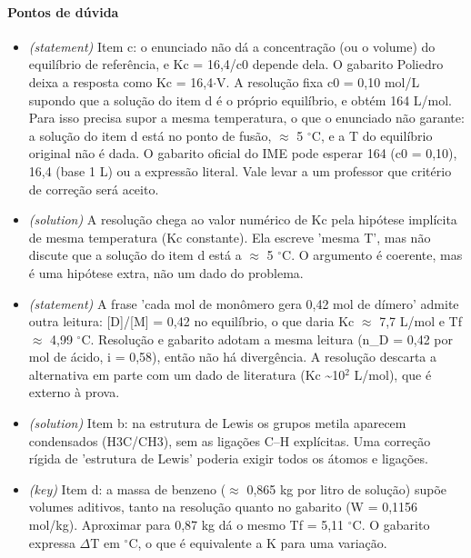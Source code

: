 \documentclass{article}%
\begin{document}
\paragraph{Pontos de dúvida}%
\begin{itemize}%
\item%
\textit{(statement)} Item c: o enunciado não dá a concentração (ou o volume) do equilíbrio de referência, e Kc = 16,4/c0 depende dela. O gabarito Poliedro deixa a resposta como Kc = 16,4$\cdot$V. A resolução fixa c0 = 0,10 mol/L supondo que a solução do item d é o próprio equilíbrio, e obtém 164 L/mol. Para isso precisa supor a mesma temperatura, o que o enunciado não garante: a solução do item d está no ponto de fusão, $\approx$ 5 $^\circ$C, e a T do equilíbrio original não é dada. O gabarito oficial do IME pode esperar 164 (c0 = 0,10), 16,4 (base 1 L) ou a expressão literal. Vale levar a um professor que critério de correção será aceito.%
\item%
\textit{(solution)} A resolução chega ao valor numérico de Kc pela hipótese implícita de mesma temperatura (Kc constante). Ela escreve 'mesma T', mas não discute que a solução do item d está a $\approx$ 5 $^\circ$C. O argumento é coerente, mas é uma hipótese extra, não um dado do problema.%
\item%
\textit{(statement)} A frase 'cada mol de monômero gera 0,42 mol de dímero' admite outra leitura: {[}D{]}/{[}M{]} = 0,42 no equilíbrio, o que daria Kc $\approx$ 7,7 L/mol e Tf $\approx$ 4,99 $^\circ$C. Resolução e gabarito adotam a mesma leitura (n\_D = 0,42 por mol de ácido, i = 0,58), então não há divergência. A resolução descarta a alternativa em parte com um dado de literatura (Kc \textasciitilde{}10$^2$ L/mol), que é externo à prova.%
\item%
\textit{(solution)} Item b: na estrutura de Lewis os grupos metila aparecem condensados (H3C/CH3), sem as ligações C--H explícitas. Uma correção rígida de 'estrutura de Lewis' poderia exigir todos os átomos e ligações.%
\item%
\textit{(key)} Item d: a massa de benzeno ($\approx$ 0,865 kg por litro de solução) supõe volumes aditivos, tanto na resolução quanto no gabarito (W = 0,1156 mol/kg). Aproximar para 0,87 kg dá o mesmo Tf = 5,11 $^\circ$C. O gabarito expressa $\Delta$T em $^\circ$C, o que é equivalente a K para uma variação.%
\end{itemize}%
\end{document}

